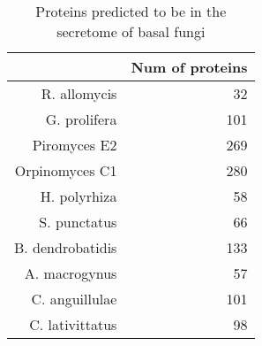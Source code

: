 \begin{table}[ht]
\centering
\caption[Chytrid secretome predictions]{Proteins predicted to be in the secretome of basal fungi} 
\label{tab:ChInhib_ChySec}
\begin{tabular}{rr}
  \hline
 & Num of proteins \\ 
  \hline
R. allomycis &  32 \\ 
  G. prolifera & 101 \\ 
  Piromyces E2 & 269 \\ 
  Orpinomyces C1 & 280 \\ 
  H. polyrhiza &  58 \\ 
  S. punctatus &  66 \\ 
  B. dendrobatidis & 133 \\ 
  A. macrogynus &  57 \\ 
  C. anguillulae & 101 \\ 
  C. lativittatus &  98 \\ 
   \hline
\end{tabular}
\end{table}